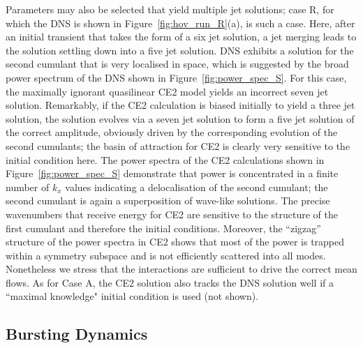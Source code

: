 \documentclass{jfm}
\begin{document}
Parameters may also be selected that yield multiple jet solutions; case R, for which the DNS is shown in Figure~\ref{fig:hov_run_R}(a), is such a case. Here, after an initial transient that takes the form of a six jet solution, a jet merging leads to the solution settling down into a five jet solution. DNS exhibits a solution for the second cumulant that is very localised in space, which is suggested by the broad power spectrum of the DNS shown in Figure~\ref{fig:power_spec_S}. For this case, the maximally ignorant quasilinear CE2 model yields an incorrect seven jet solution. Remarkably, if the CE2 calculation is biased  initially to yield a three jet solution, the solution evolves via a seven jet solution to form a five jet solution of the correct amplitude, obviously driven by the corresponding evolution of the second cumulants; the basin of attraction for CE2 is clearly very sensitive to the initial condition here. The power spectra of the CE2 calculations shown in Figure~\ref{fig:power_spec_S} demonstrate that power is concentrated in a finite number of $k_x$ values indicating a delocalisation of the second cumulant; the second cumulant is again a superposition of wave-like solutions. The precise wavenumbers that receive energy for CE2 are sensitive to the structure of the first cumulant and therefore the initial conditions. Moreover, the  ``zigzag'' structure of the power spectra in CE2 shows that most of the power is trapped within a symmetry subspace and is not efficiently scattered into all modes. Nonetheless we stress that the interactions are sufficient to drive the correct mean flows.  As for Case A, the CE2 solution also tracks the DNS solution well if a ``maximal knowledge" initial condition is used (not shown).



\subsection{Bursting Dynamics}
\end{document}
